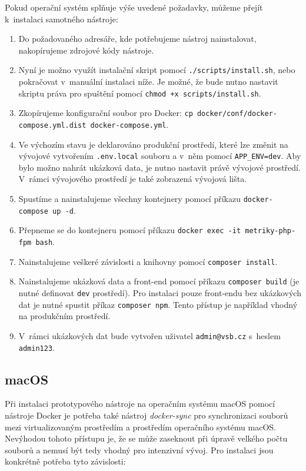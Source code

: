 \documentclass[czech,master]{diploma}
\begin{document}
Pokud operační systém splňuje výše uvedené požadavky, můžeme přejít k~instalaci samotného nástroje:
\begin{enumerate}
\item Do požadovaného adresáře, kde potřebujeme nástroj nainstalovat, nakopírujeme zdrojové kódy nástroje.
\item Nyní je možno využít instalační skript pomocí \texttt{./scripts/install.sh}, nebo pokračovat v~manuální instalaci níže. Je možné, že bude nutno nastavit skriptu práva pro spuštění pomocí \texttt{chmod +x scripts/install.sh}.
\item Zkopírujeme konfigurační soubor pro Docker: \texttt{cp docker/conf/docker-compose.yml.dist docker-compose.yml}.
\item Ve výchozím stavu je deklarováno produkční prostředí, které lze změnit na vývojové vytvořením \texttt{.env.local} souboru a v~něm pomocí \texttt{APP\_ENV=dev}.  Aby bylo možno nahrát ukázková data, je nutno nastavit právě vývojové prostředí. V~rámci vývojového prostředí je také zobrazená vývojová lišta.
\item Spustíme a nainstalujeme všechny kontejnery pomocí příkazu \texttt{docker-compose up -d}.
\item Přepneme se do kontejneru pomocí příkazu \texttt{docker exec -it metriky-php-fpm bash}.
\item Nainstalujeme veškeré závislosti a knihovny pomocí \texttt{composer install}.
\item Nainstalujeme ukázková data a front-end pomocí příkazu \texttt{composer build} (je nutné definovat \texttt{dev} prostředí). Pro instalaci pouze front-endu bez ukázkových dat je nutné spustit příkaz \texttt{composer npm}. Tento přístup je například vhodný na produkčním prostředí.
\item V~rámci ukázkových dat bude vytvořen uživatel \texttt{admin@vsb.cz} s~heslem \texttt{admin123}.
\end{enumerate}

\subsection{macOS}
Při instalaci prototypového nástroje na operačním systému macOS pomocí nástroje Docker je potřeba také nástroj \textit{docker-sync} pro synchronizaci souborů mezi virtualizovaným prostředím a prostředím operačního systému macOS. Nevýhodou tohoto přístupu je, že se může zaseknout při úpravě velkého počtu souborů a nemusí být tedy vhodný pro intenzivní vývoj. Pro instalaci jsou konkrétně potřeba tyto závislosti:
\end{document}
